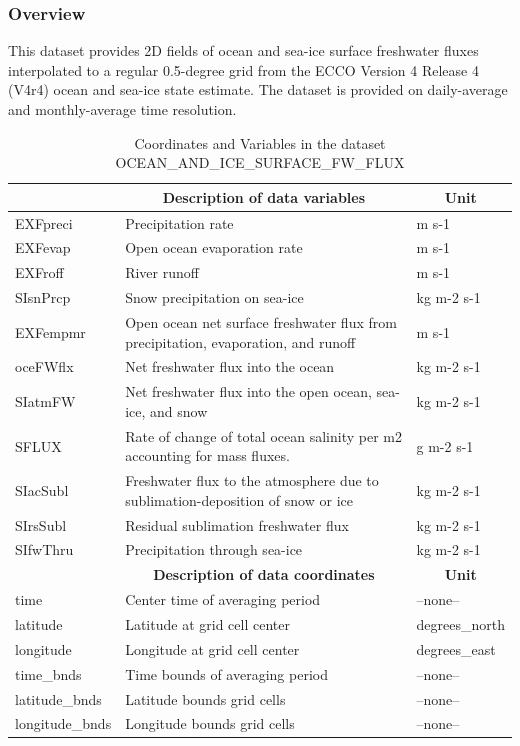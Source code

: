 \subsubsection{Overview}
This dataset provides 2D fields of ocean and sea-ice surface freshwater fluxes interpolated to a regular 0.5-degree grid from the ECCO Version 4 Release 4 (V4r4) ocean and sea-ice state estimate. The dataset is provided on daily-average and monthly-average time resolution. 
\begin{longtable}{|m{}|m{}|m{}|}
\caption{Coordinates and Variables in the dataset OCEAN\_AND\_ICE\_SURFACE\_FW\_FLUX}
\label{tab:table-OCEAN_AND_ICE_SURFACE_FW_FLUX-fields} \\ 
\hline \endhead \hline \endfoot
\rowcolor{lightgray} \multicolumn{1}{|c|}{\textbf{Variables}} & \multicolumn{1}{|c|}{\textbf{Description of data variables}} &  \multicolumn{1}{|c|}{\textbf{Unit}}\\ \hline
EXFpreci &Precipitation rate &m s-1  \\ \hline
EXFevap &Open ocean evaporation rate &m s-1  \\ \hline
EXFroff &River runoff &m s-1  \\ \hline
SIsnPrcp &Snow precipitation on sea-ice &kg m-2 s-1  \\ \hline
EXFempmr &Open ocean net surface freshwater flux from precipitation, evaporation, and runoff &m s-1  \\ \hline
oceFWflx &Net freshwater flux into the ocean &kg m-2 s-1  \\ \hline
SIatmFW &Net freshwater flux into the open ocean, sea-ice, and snow &kg m-2 s-1  \\ \hline
SFLUX &Rate of change of total ocean salinity per m2 accounting for mass fluxes. &g m-2 s-1  \\ \hline
SIacSubl &Freshwater flux to the atmosphere due to sublimation-deposition of snow or ice &kg m-2 s-1  \\ \hline
SIrsSubl &Residual sublimation freshwater flux &kg m-2 s-1  \\ \hline
SIfwThru &Precipitation through sea-ice &kg m-2 s-1  \\ \hline
\rowcolor{lightgray} \multicolumn{1}{|c|}{\textbf{Coordinates}} & \multicolumn{1}{|c|}{\textbf{Description of data coordinates}} &  \multicolumn{1}{|c|}{\textbf{Unit}}\\ \hline
time &Center time of averaging period &--none--  \\ \hline
latitude &Latitude at grid cell center &degrees\_north  \\ \hline
longitude &Longitude at grid cell center &degrees\_east  \\ \hline
time\_bnds &Time bounds of averaging period &--none--  \\ \hline
latitude\_bnds &Latitude bounds grid cells &--none--  \\ \hline
longitude\_bnds &Longitude bounds grid cells &--none--  \\ \hline
\end{longtable}

